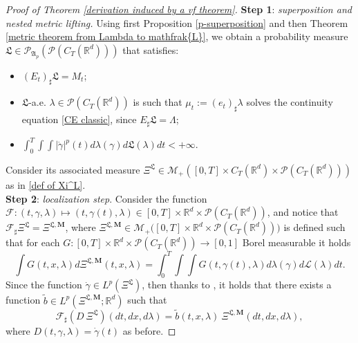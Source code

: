 \documentclass[10pt,leqno]{amsart}
\numberwithin{equation}{section}
\renewcommand{\L}{\mathcal{L}}
\newcommand{\R}{\mathbb{R}}
\newcommand{\PP}{\mathcal{P}}
\begin{document}
\begin{proof}[Proof of Theorem \ref{derivation induced by a vf theorem}]
    \textbf{Step 1}: \textit{superposition and nested metric lifting.} Using first Proposition \ref{p-superposition} and then Theorem \ref{metric theorem from Lambda to mathfrak{L}}, we obtain a probability measure $\mathfrak{L}\in\PP_{\mathfrak{A}_p}(\PP(C_T(\R^d)))$ that satisfies: 
    \begin{itemize}
        \item[(i)] $(E_t)_\sharp \mathfrak{L} = M_t$;
        \item[(ii)]$\mathfrak{L}$-a.e. $\lambda\in \PP(C_T(\R^d))$ is such that $\mu_t:= (e_t)_\sharp  \lambda$ solves the continuity equation \eqref{CE classic}, since $E_\sharp  \mathfrak{L}  = \Lambda$; \label{condition ii L} 
        \item[(iii)]
        $\int_0^T \int \int |\dot\gamma|^p(t)  d\lambda(\gamma) d\mathfrak{L}(\lambda) dt<+\infty.$
    \end{itemize}
    Consider its associated measure $\Xi^{\mathfrak{L}} \in \mathcal{M}_+([0,T]\times C_T(\R^d) \times \PP(C_T(\R^d)))$ as in \eqref{def of Xi^L}.
    \\
    \textbf{Step 2}: \textit{localization step}. Consider the function $\mathcal{F}: (t,\gamma,\lambda) \mapsto (t,\gamma(t),\lambda) \in [0,T]\times \R^d \times \PP(C_T(\R^d))$, and notice that $\mathcal{F}_\sharp \Xi^{\mathfrak{L}} = \Xi^{\mathfrak{L},\boldsymbol{M}}$, where $\Xi^{\mathfrak{L},\boldsymbol{M}}\in \mathcal{M}_+\big( [0,T]\times \R^d \times \PP(C_T(\R^d)) \big)$ is defined such that for each $G:[0,T]\times \R^d \times \PP(C_T(\R^d)) \to [0,1]$ Borel measurable it holds
    \[\int G(t,x,\lambda) d\Xi^{\mathfrak{L},\boldsymbol{M}}(t,x,\lambda) = \int_0^T \int \int G(t,\gamma(t),\lambda) d\lambda(\gamma) d\mathfrak{\L}(\lambda) dt.\]
    Since the function $\dot\gamma \in L^p(\Xi^{\mathfrak{L}})$, then thanks to \cite[Lemma 17.3]{ambrosio2021lectures}, it holds that there exists a function $\tilde{b} \in L^p(\Xi^{\mathfrak{L},\boldsymbol{M}};\R^d)$ such that 
    \[\mathcal{F}_\sharp (D \ \Xi^{\mathfrak{L}})(dt,dx,d\lambda) = \tilde{b}(t,x,\lambda) \ \Xi^{\mathfrak{L},\boldsymbol{M}}(dt,dx,d\lambda),\]
    where $D(t,\gamma,\lambda)= \dot\gamma(t)$ as before.
    

\end{proof}
\end{document}
